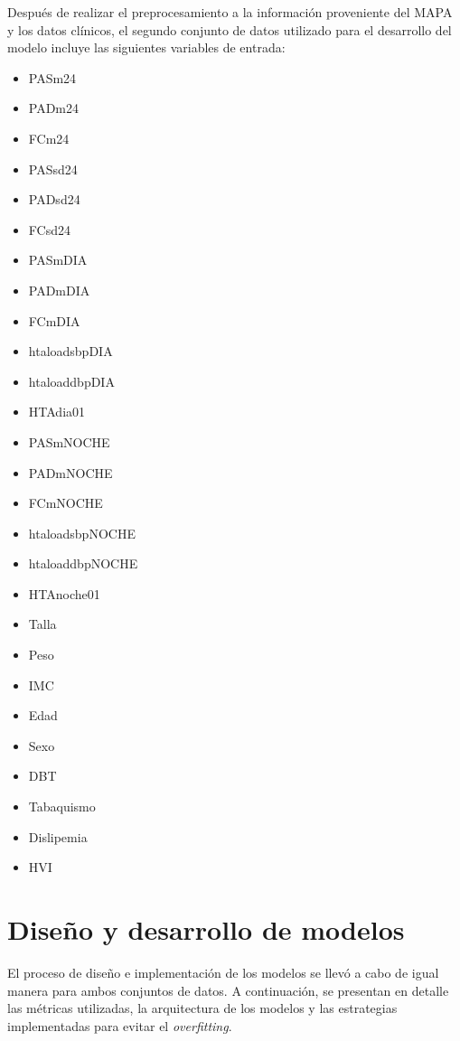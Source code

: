 Después de realizar el preprocesamiento a la información proveniente del MAPA y los datos clínicos, el segundo conjunto de 
datos utilizado para el desarrollo del modelo incluye las siguientes variables de entrada:

\begin{itemize}
  \item PASm24	
  \item PADm24
  \item FCm24
  \item PASsd24 
  \item PADsd24
  \item FCsd24
  \item PASmDIA
  \item PADmDIA
  \item FCmDIA
  \item htaloadsbpDIA 
  \item htaloaddbpDIA   
  \item HTAdia01	
  \item PASmNOCHE
  \item PADmNOCHE
  \item FCmNOCHE
  \item htaloadsbpNOCHE
  \item htaloaddbpNOCHE
  \item HTAnoche01
  \item Talla
  \item Peso
  \item IMC
  \item Edad
  \item Sexo
  \item DBT
  \item Tabaquismo
  \item Dislipemia
  \item HVI
\end{itemize}

\section{Diseño y desarrollo de modelos}
El proceso de diseño e implementación de los modelos se llevó a cabo de igual manera para ambos 
conjuntos de datos. A continuación, se presentan en detalle las métricas utilizadas, la 
arquitectura de los modelos y las estrategias implementadas para evitar el \emph{overfitting}.

